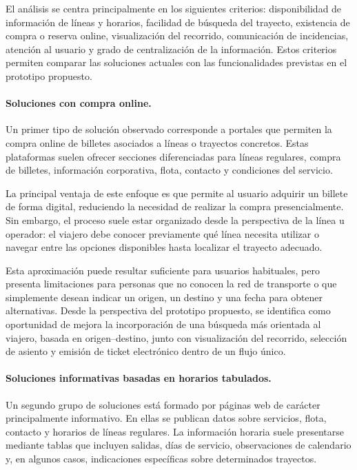 El análisis se centra principalmente en los siguientes criterios: disponibilidad de información de líneas y horarios, facilidad de búsqueda del trayecto, existencia de compra o reserva online, visualización del recorrido, comunicación de incidencias, atención al usuario y grado de centralización de la información. Estos criterios permiten comparar las soluciones actuales con las funcionalidades previstas en el prototipo propuesto.

\paragraph{Soluciones con compra online.}
Un primer tipo de solución observado corresponde a portales que permiten la compra online de billetes asociados a líneas o trayectos concretos. Estas plataformas suelen ofrecer secciones diferenciadas para líneas regulares, compra de billetes, información corporativa, flota, contacto y condiciones del servicio.

La principal ventaja de este enfoque es que permite al usuario adquirir un billete de forma digital, reduciendo la necesidad de realizar la compra presencialmente. Sin embargo, el proceso suele estar organizado desde la perspectiva de la línea u operador: el viajero debe conocer previamente qué línea necesita utilizar o navegar entre las opciones disponibles hasta localizar el trayecto adecuado.

Esta aproximación puede resultar suficiente para usuarios habituales, pero presenta limitaciones para personas que no conocen la red de transporte o que simplemente desean indicar un origen, un destino y una fecha para obtener alternativas. Desde la perspectiva del prototipo propuesto, se identifica como oportunidad de mejora la incorporación de una búsqueda más orientada al viajero, basada en origen--destino, junto con visualización del recorrido, selección de asiento y emisión de ticket electrónico dentro de un flujo único.

\paragraph{Soluciones informativas basadas en horarios tabulados.}
Un segundo grupo de soluciones está formado por páginas web de carácter principalmente informativo. En ellas se publican datos sobre servicios, flota, contacto y horarios de líneas regulares. La información horaria suele presentarse mediante tablas que incluyen salidas, días de servicio, observaciones de calendario y, en algunos casos, indicaciones específicas sobre determinados trayectos.

